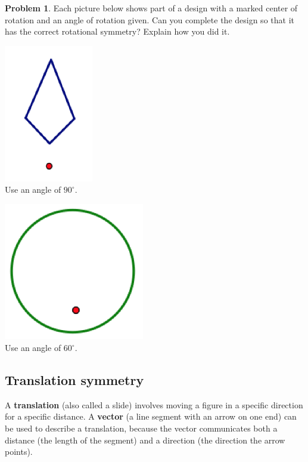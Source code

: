 \documentclass[12pt, reqno]{amsart}
\theoremstyle{remark}
\theoremstyle{definition}
\newtheorem{problem}{Problem}
\numberwithin{equation}{section}  %
\begin{document}
\begin{problem}
Each picture below shows part of a design with a marked center of rotation and an angle of rotation given.    Can you complete the design so that it has the correct rotational symmetry?  Explain how you did it.

\begin{center}
\includegraphics[height=6cm]{makerot1}\\
Use an angle of $90^\circ$.

\vfill


\includegraphics[height=6cm]{makerot2}\\
Use an angle of $60^\circ$.

\end{center}

\vfill

\end{problem}


\newpage
\subsection*{Translation symmetry}
A {\bf translation} (also called a slide) involves moving a figure in a specific direction for a specific distance. A {\bf vector} (a line segment with an arrow on one end) can be used to describe a translation, because the vector communicates both a distance (the length of the segment) and a direction (the direction the arrow points).
\end{document}
